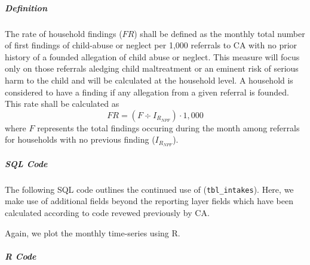 \documentclass[12pt]{article}\usepackage[]{graphicx}\usepackage[]{color}
\begin{document}
\subparagraph{Definition} The rate of household findings ($FR$) shall be defined as the monthly total number of first findings of child-abuse or neglect per 1,000 referrals to CA with no prior history of a founded allegation of child abuse or neglect. This measure will focus only on those referrals aledging child maltreatment or an eminent risk of serious harm to the child and will be calculated at the household level. A household is considered to have a finding if any allegation from a given referral is founded. This rate shall be calculated as 
\begin{equation}\label{eq:FR}
FR = (F \div I_{R_{NPF}}) \cdot 1,000
\end{equation}
where $F$ represents the total findings occuring during the month among referrals for households with no previous finding ($I_{R_{NPF}}$). 

\subparagraph{SQL Code}

The following SQL code outlines the continued use of (\texttt{tbl\_intakes}). Here, we make use of additional fields beyond the reporting layer fields which have been calculated according to code revewed previously by CA. 



Again, we plot the monthly time-series using R.  

\subparagraph{R Code}
\end{document}
